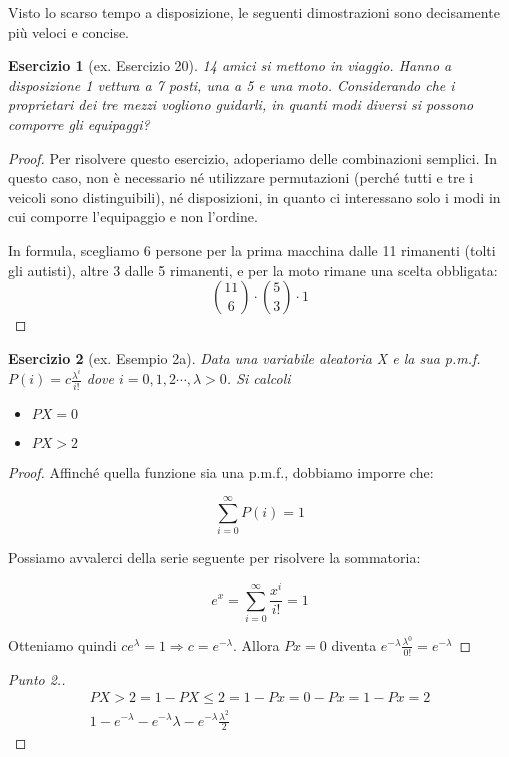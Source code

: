 \documentclass[12pt]{article}
\newtheorem{theorem}{Esercizio}
\renewcommand\qedsymbol{$\square$}
\begin{document}
Visto lo scarso tempo a disposizione, le seguenti dimostrazioni sono decisamente più veloci e concise.

\begin{theorem}[ex. Esercizio 20]
	14 amici si mettono in viaggio. Hanno a disposizione 1 vettura a 7 posti, una a 5 e una moto. Considerando che i proprietari dei tre mezzi vogliono guidarli, in quanti modi diversi si possono comporre gli equipaggi?
\end{theorem}

\begin{proof}
	Per risolvere questo esercizio, adoperiamo delle combinazioni semplici. In questo caso, non è necessario né utilizzare permutazioni (perché tutti e tre i veicoli sono distinguibili), né disposizioni, in quanto ci interessano solo i modi in cui comporre l'equipaggio e non l'ordine.
	
	In formula, scegliamo 6 persone per la prima macchina dalle 11 rimanenti (tolti gli autisti), altre 3 dalle 5 rimanenti, e per la moto rimane una scelta obbligata:
	\[
		\binom{11}{6} \cdot \binom{5}{3} \cdot 1
    \]
\end{proof}

\begin{theorem}[ex. Esempio 2a]
	Data una variabile aleatoria X e la sua p.m.f. $P(i) = c \frac{\lambda^i}{i!}$ dove $i = 0, 1, 2 \cdots, \lambda > 0$. Si calcoli
	\begin{itemize}
		\item $P{X=0}$
		\item $P{X>2}$
	\end{itemize}
\end{theorem}

\begin{proof}
	Affinché quella funzione sia una p.m.f., dobbiamo imporre che:

	\[
		\sum_{i = 0}^{\infty} P(i) = 1
    \]

	Possiamo avvalerci della serie seguente per risolvere la sommatoria:

	\[
		e^x = \sum_{i = 0}^{\infty} \frac{x^i}{i!}= 1
	\]

	Otteniamo quindi $ce^\lambda = 1 \Rightarrow c = e^{-\lambda}$. Allora $P{x = 0}$ diventa $e^{-\lambda}\frac{\lambda^0}{0!} = e^{-\lambda}$
\end{proof}

\renewcommand\qedsymbol{$\blacksquare$}

\begin{proof}[Punto 2.]
	\begin{gather*}
		P{X > 2} = 1 - P{X \le 2} = 1 - P{x = 0} - P{x = 1} - P{x = 2} \\
		1 - e^{-\lambda} - e^{-\lambda}\lambda  - e^{-\lambda}	\frac{\lambda^2}{2}
	\end{gather*}
\end{proof}
\end{document}
